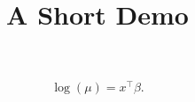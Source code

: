 \documentclass[article]{jss}
\title{A Short Demo}
\begin{document}
\begin{equation}
\log(\mu) = x^\top \beta.
\end{equation}
\end{document}
